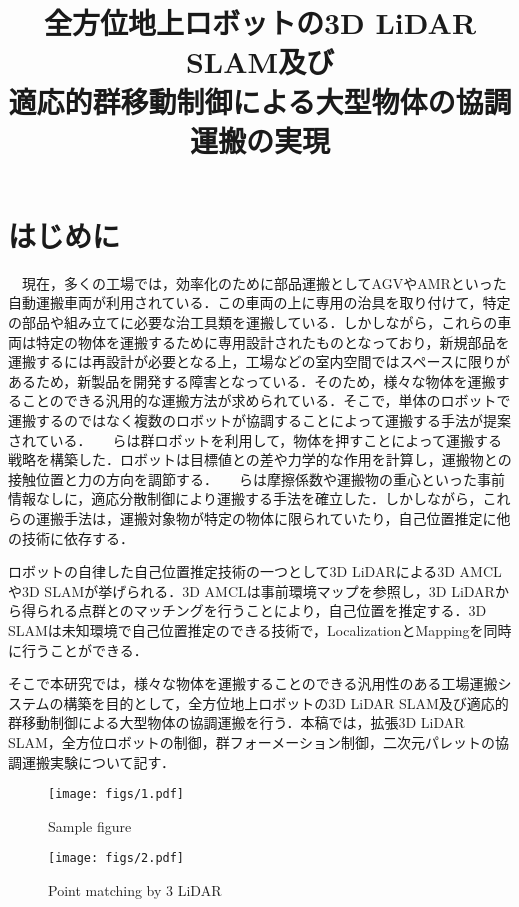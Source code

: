 \documentclass[a4jsme]{jsmepaper}
\title{
  全方位地上ロボットの3D LiDAR SLAM及び\\適応的群移動制御による大型物体の協調運搬の実現
}
\begin{document}
\maketitle
\thispagestyle{empty}

\section{はじめに}
　現在，多くの工場では，効率化のために部品運搬としてAGVやAMRといった自動運搬車両が利用されている．この車両の上に専用の治具を取り付けて，特定の部品や組み立てに必要な治工具類を運搬している．しかしながら，これらの車両は特定の物体を運搬するために専用設計されたものとなっており，新規部品を運搬するには再設計が必要となる上，工場などの室内空間ではスペースに限りがあるため，新製品を開発する障害となっている．そのため，様々な物体を運搬することのできる汎用的な運搬方法が求められている．そこで，単体のロボットで運搬するのではなく複数のロボットが協調することによって運搬する手法が提案されている．　　らは群ロボットを利用して，物体を押すことによって運搬する戦略を構築した．ロボットは目標値との差や力学的な作用を計算し，運搬物との接触位置と力の方向を調節する．　　らは摩擦係数や運搬物の重心といった事前情報なしに，適応分散制御により運搬する手法を確立した．しかしながら，これらの運搬手法は，運搬対象物が特定の物体に限られていたり，自己位置推定に他の技術に依存する．

ロボットの自律した自己位置推定技術の一つとして3D LiDARによる3D AMCL\cite{3d-AMCL}や3D SLAM\cite{6DSLAM_outside, 3D_SLAM_outside, EKF_SLAM, FAST-LIO, FAST-LIO2}が挙げられる．3D AMCLは事前環境マップを参照し，3D LiDARから得られる点群とのマッチングを行うことにより，自己位置を推定する．3D SLAMは未知環境で自己位置推定のできる技術で，LocalizationとMappingを同時に行うことができる．

そこで本研究では，様々な物体を運搬することのできる汎用性のある工場運搬システムの構築を目的として，全方位地上ロボットの3D LiDAR SLAM及び適応的群移動制御による大型物体の協調運搬を行う．本稿では，拡張3D LiDAR SLAM，全方位ロボットの制御，群フォーメーション制御，二次元パレットの協調運搬実験について記す．

\begin{figure}[htbp]
  \begin{center}
  \vspace{1zh}
    \texttt{[image: figs/1.pdf]}
  \end{center}
  \caption{Sample figure}
  \label{fig:fig1}
\end{figure}

\begin{figure}[htbp]
  \begin{center}
  \vspace{1zh}
    \texttt{[image: figs/2.pdf]}
  \end{center}
  \caption{Point matching by 3 LiDAR}
  \label{fig:fig2}
\end{figure}
\end{document}
